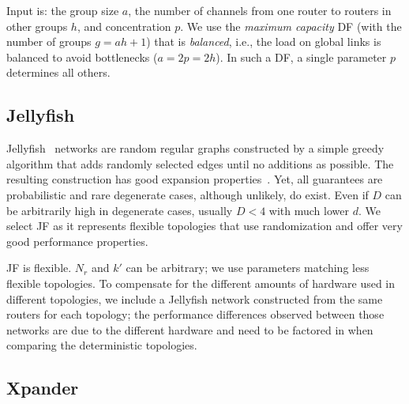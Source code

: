 \noindent
{}
%
Input is: the group size $a$, the number of channels from one
router to routers in other groups $h$, and concentration $p$. We use the
\emph{maximum capacity} DF (with the number of groups $g = ah+1$) that is
\emph{balanced}, i.e., the load on global links is balanced to avoid
bottlenecks ($a = 2p = 2h$).
In such a DF, a single parameter $p$ determines all others.

\subsection{Jellyfish}
 
Jellyfish~\cite{singla2012jellyfish} networks are random regular graphs
constructed by a simple greedy algorithm that adds randomly selected edges
until no additions as possible. The resulting construction has good expansion
properties~\cite{bondy1976graph}. Yet, all guarantees are probabilistic and
rare degenerate cases, although unlikely, do exist. Even if $D$ can be
arbitrarily high in degenerate cases, usually $D < 4$ with much lower $d$.
%
We select JF as it represents flexible topologies that use randomization and
offer very good performance properties.


\noindent
{}
%
JF is flexible. $N_r$ and $k'$ can be arbitrary; we use parameters matching
less flexible  topologies.
%
% 
%
To compensate for the different amounts of hardware used in different
topologies, we include a Jellyfish network constructed from the same routers
for each topology; the performance differences observed between those networks
are due to the different hardware and need to be factored in when comparing
the deterministic topologies. 

\subsection{Xpander}


